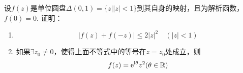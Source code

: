 \begin{proposition}
    
    设$f(z)$是单位圆盘$\Delta(0, 1) = \{z \big| |z| < 1 \}$到其自身的映射，且为解析函数，$f(0) = 0$. 证明：
    
    \begin{enumerate}
        
        \item   $$|f(z) + f(-z)| \leq 2 |z|^2 \quad (|z| < 1)$$
        
        \item   如果$\exists z_0 \neq 0$，使得上面不等式中的等号在$z = z_0$处成立，则
                $$f(z) = \mathrm{e}^{\mathrm{i}\theta}z^2(\theta \in \mathbb{{R}})$$

    \end{enumerate}

\end{proposition}


